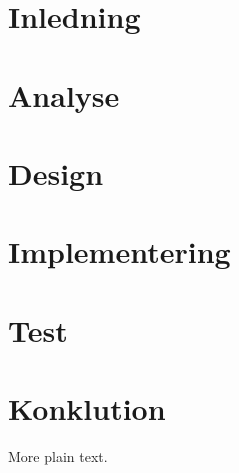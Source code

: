\documentclass[11pt,a4paper]{report}  	%
\begin{document}
\nocite{*}					%



\tableofcontents

\chapter{Inledning}


\chapter{Analyse}


\chapter{Design}


\chapter{Implementering}


\chapter{Test}


\chapter{Konklution}





More plain text.\cite{pear}	%

\end{document}

